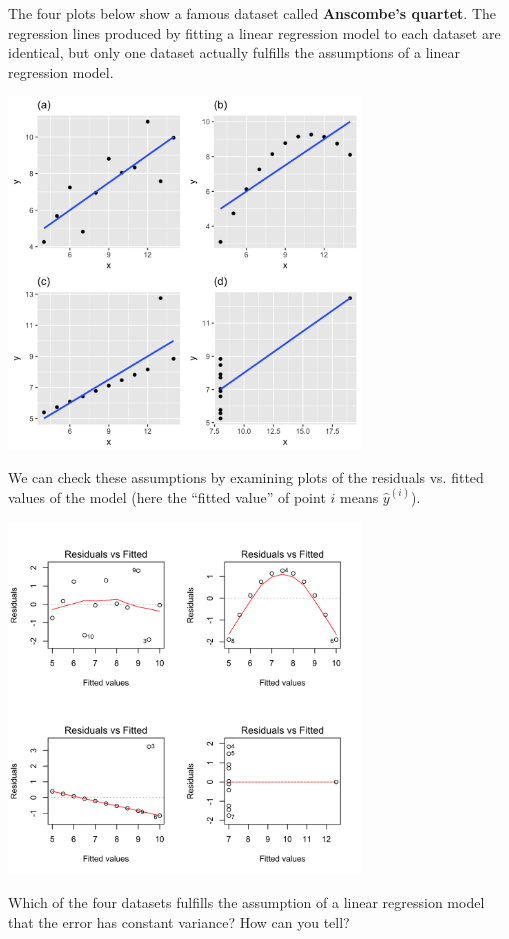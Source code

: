 \begin{question}{}
The four plots below show a famous dataset called \textbf{Anscombe's quartet}. The regression lines produced by fitting a linear regression model to each dataset are identical, but only one dataset actually fulfills the assumptions of a linear regression model. 
\begin{center}
\includegraphics[width=0.7\textwidth]{img/anscombe.png}
\end{center}
We can check these assumptions by examining plots of the residuals vs. fitted values of the model (here the ``fitted value'' of point $i$ means $\hat{y}^{(i)}$). 
\begin{center}
\includegraphics[width=0.7\textwidth]{img/anscombe-diagnostics-1.png}
\end{center}
Which of the four datasets fulfills the assumption of a linear regression model that the error has constant variance? How can you tell?
\end{question}


